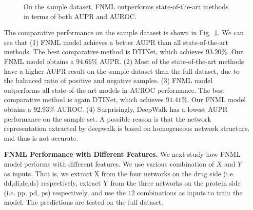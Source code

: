 \documentclass[conference]{IEEEtran}
\begin{document}
\begin{figure}[ht]
\centering
{}
\vspace*{-10pt}
\caption{On the sample dataset, FNML outperforms state-of-the-art methods in terms of both AUPR and AUROC.}\label{fig:sample}

\end{figure}

The comparative performance on the sample dataset is shown in Fig.~\ref{fig:sample}. We can see that (1) FNML model achieves a better AUPR than all state-of-the-art methods. The best comparative method is DTINet, which achieves $93.20\%$. Our FNML model obtains a $94.66\%$ AUPR. (2) Most of the state-of-the-art methods have a higher AUPR result on the sample dataset than the full dataset, due to the balanced ratio of positive and negative samples. (3) FNML model outperforms all state-of-the-art models in AUROC performance.  The best comparative method is again DTINet, which achieves $91.41\%$. Our FNML model obtains a $92.93\%$ AUROC. (4) Surprisingly, DeepWalk has a lowest AUPR performance on the sample set. A possible reason is that the network representation extracted by deepwalk is based on homogeneous network structure, and thus is not accurate. 

\textbf{FNML Performance with Different Features.} We next study how FNML model performs with different features. We use various combination of $X$ and $Y$ as inputs. That is, we extract X from the four networks on the drug side (i.e. dd,di,de,ds) respectively, extract Y from the three networks on the protein side (i.e. pp, pd, ps) respectively, and use the $12$ combinations as inputs to train the model. The predictions are tested on the full dataset.
\end{document}
